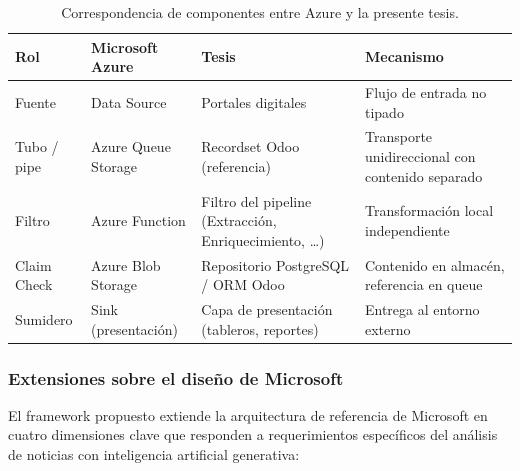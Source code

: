 \begin{table}[H]
  \centering
  \caption{Correspondencia de componentes entre Azure y la presente tesis.}
  \label{tab:correspondencia-azure}
  \footnotesize
  \setlength{\tabcolsep}{4pt}
  \begin{tabularx}{\textwidth}{@{}l l l X@{}}
    \toprule
    \textbf{Rol} & \textbf{Microsoft Azure} & \textbf{Tesis} & \textbf{Mecanismo} \\
    \midrule
    Fuente & Data Source & Portales digitales & Flujo de entrada no tipado \\
    \addlinespace
    Tubo / pipe & Azure Queue Storage & Recordset Odoo (referencia) &
      Transporte unidireccional con contenido separado \\
    \addlinespace
    Filtro & Azure Function & Filtro del pipeline (Extracción, Enriquecimiento, \ldots) &
      Transformación local independiente \\
    \addlinespace
    Claim Check & Azure Blob Storage & Repositorio PostgreSQL / ORM Odoo &
      Contenido en almacén, referencia en queue \\
    \addlinespace
    Sumidero & Sink (presentación) & Capa de presentación (tableros, reportes) &
      Entrega al entorno externo \\
    \bottomrule
  \end{tabularx}
\end{table}

\subsubsection{Extensiones sobre el diseño de Microsoft}

El framework propuesto extiende la arquitectura de referencia de Microsoft
en cuatro dimensiones clave que responden a requerimientos específicos del
análisis de noticias con inteligencia artificial generativa:

